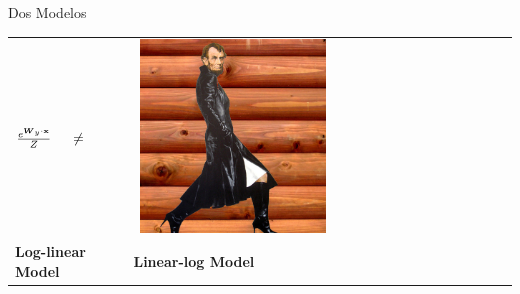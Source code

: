 \documentclass[xcolor=pdftex,x11names,table,hyperref]{beamer}
\begin{document}
\begin{frame}{Dos Modelos}
	\begin{tabular}{>{\centering\arraybackslash}m{12em} >{\centering\arraybackslash}m{12em} }
		\Huge\bf \centering $ \frac{{\mathnormal e}^{\boldsymbol W_y \cdot \mathbf{x}} }{Z} \ \ \ \ \neq $  &  \ \includegraphics[width=0.5\textwidth]{images/linear-log-model.jpg} \\
		\Large\bf Log-linear Model & \Large\bf Linear-log Model \\
	\end{tabular}
\end{frame}



\end{document}
